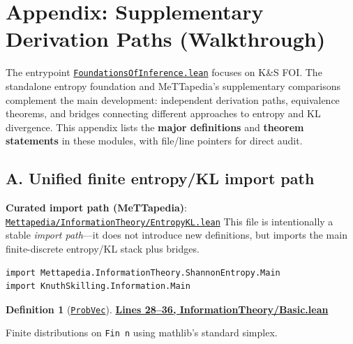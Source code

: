 \documentclass[11pt]{article}
\theoremstyle{definition}
\newtheorem{definition}[theorem]{Definition}
\theoremstyle{remark}
\begin{document}
\section*{Appendix: Supplementary Derivation Paths (Walkthrough)}
\label{app:supplementary}

The entrypoint \href{https://github.com/zariuq/ks-foundations-of-inference/blob/main/KnuthSkilling/FoundationsOfInference.lean}{\texttt{FoundationsOfInference.lean}} focuses on K\&S FOI.
The standalone entropy foundation and MeTTapedia's supplementary comparisons complement the main development: independent derivation paths, equivalence theorems, and bridges connecting different approaches to entropy and KL divergence. This appendix lists the \textbf{major definitions} and \textbf{theorem statements} in these modules, with file/line pointers for direct audit.

\subsection*{A. Unified finite entropy/KL import path}

\textbf{Curated import path (MeTTapedia)}: \href{https://github.com/zariuq/MeTTapedia/blob/main/lean/mettapedia/Mettapedia/InformationTheory/EntropyKL.lean}{\texttt{Mettapedia/InformationTheory/EntropyKL.lean}}
This file is intentionally a stable \emph{import path}---it does not introduce new
definitions, but imports the main finite-discrete entropy/KL stack plus bridges.

\begin{lstlisting}[caption={Curated entrypoint: entropy + KL from all routes (imports only)}]
import Mettapedia.InformationTheory.ShannonEntropy.Main
import KnuthSkilling.Information.Main
\end{lstlisting}

\begin{definition}[\href{https://github.com/zariuq/ks-foundations-of-inference/blob/main/InformationTheory/Basic.lean\#L36}{\texttt{ProbVec}}]
\textbf{\href{https://github.com/zariuq/ks-foundations-of-inference/blob/main/InformationTheory/Basic.lean\#L28-L36}{Lines 28--36, InformationTheory/Basic.lean}}

Finite distributions on \texttt{Fin n} using mathlib's standard simplex.
\end{definition}
\end{document}
